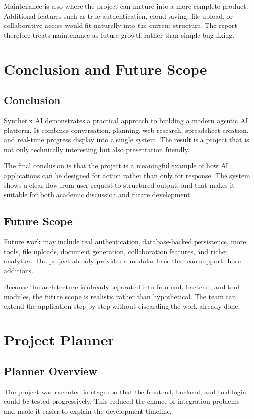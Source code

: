 \documentclass[11pt,oneside]{report}
\newcommand{\ProjectTitle}{Synthetix AI}
\begin{document}
Maintenance is also where the project can mature into a more complete product. Additional features such as true authentication, cloud saving, file upload, or collaborative access would fit naturally into the current structure. The report therefore treats maintenance as future growth rather than simple bug fixing.

\chapter{Conclusion and Future Scope}
\section{Conclusion}
\ProjectTitle{} demonstrates a practical approach to building a modern agentic AI platform. It combines conversation, planning, web research, spreadsheet creation, and real-time progress display into a single system. The result is a project that is not only technically interesting but also presentation friendly.

The final conclusion is that the project is a meaningful example of how AI applications can be designed for action rather than only for response. The system shows a clear flow from user request to structured output, and that makes it suitable for both academic discussion and future development.

\section{Future Scope}
Future work may include real authentication, database-backed persistence, more tools, file uploads, document generation, collaboration features, and richer analytics. The project already provides a modular base that can support those additions.

Because the architecture is already separated into frontend, backend, and tool modules, the future scope is realistic rather than hypothetical. The team can extend the application step by step without discarding the work already done.

\appendix
\chapter{Project Planner}
\section{Planner Overview}
The project was executed in stages so that the frontend, backend, and tool logic could be tested progressively. This reduced the chance of integration problems and made it easier to explain the development timeline.
\end{document}
